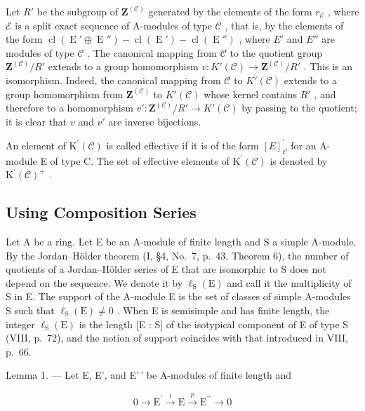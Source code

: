 Let \(R'\) be the subgroup of \(\mathbf{Z}^{(\mathcal{C})}\) generated by the elements of the form \(r_{\mathcal{E}}\) , where \(\mathcal{E}\) is a split exact sequence of A-modules of type \(\mathcal{C}\) , that is, by the elements of the form \(\operatorname{cl}(\operatorname{E}' \oplus \operatorname{E}'') - \operatorname{cl}(\operatorname{E}') - \operatorname{cl}(\operatorname{E}'')\) , where \(E'\) and \(E''\) are modules of type \(\mathcal{C}\) . The canonical mapping from \(\mathcal{C}\) to the quotient group \(\mathbf{Z}^{(\mathcal{C})}/R'\) extends to a group homomorphism \(v: K'(\mathcal{C}) \to \mathbf{Z}^{(\mathcal{C})}/R'\) . This is an isomorphism. Indeed, the canonical mapping from \(\mathcal{C}\) to \(K'(\mathcal{C})\) extends to a group homomorphism from \(\mathbf{Z}^{(\mathcal{C})}\) to \(K'(\mathcal{C})\) whose kernel contains \(R'\) , and therefore to a homomorphism \(v': \mathbf{Z}^{(\mathcal{C})}/R' \to K'(\mathcal{C})\) by passing to the quotient; it is clear that \(v\) and \(v'\) are inverse bijections.

An element of \(\mathrm{K}^{\prime}(\mathcal{C})\) is called effective if it is of the form \([E]_{\mathcal{C}}^{\prime}\) for an A-module E of type C. The set of effective elements of \(\mathrm{K}^{\prime}(\mathcal{C})\) is denoted by \(\mathrm{K}^{\prime}(\mathcal{C})^{+}\) .

\subsection{Using Composition Series}

Let A be a ring. Let E be an A-module of finite length and S a simple A-module. By the Jordan--Hölder theorem (I, §4, No.~7, p.~43, Theorem 6), the number of quotients of a Jordan--Hölder series of E that are isomorphic to S does not depend on the sequence. We denote it by \(\ell_{\mathrm{S}}(\mathrm{E})\) and call it the multiplicity of S in E. The support of the A-module E is the set of classes of simple A-modules S such that \(\ell_{\mathrm{S}}(\mathrm{E}) \neq 0\) . When E is semisimple and has finite length, the integer \(\ell_{\mathrm{S}}(\mathrm{E})\) is the length {[}E : S{]} of the isotypical component of E of type S (VIII, p.~72), and the notion of support coincides with that introduced in VIII, p.~66.

Lemma 1. --- Let E, E', and E'\,' be A-modules of finite length and

\[
0 \longrightarrow \mathrm{E} ^ {\prime} \stackrel {i} {\longrightarrow} \mathrm{E} \stackrel {p} {\longrightarrow} \mathrm{E} ^ {\prime \prime} \longrightarrow 0
\]

